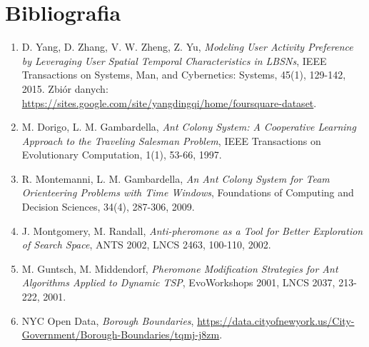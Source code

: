 \documentclass[11pt,a4paper]{article}
\begin{document}
\section*{Bibliografia}

\begin{enumerate}
  \item[{[1]}] D. Yang, D. Zhang, V. W. Zheng, Z. Yu, \emph{Modeling User Activity Preference by Leveraging User Spatial Temporal Characteristics in LBSNs}, IEEE Transactions on Systems, Man, and Cybernetics: Systems, 45(1), 129-142, 2015. Zbiór danych: \url{https://sites.google.com/site/yangdingqi/home/foursquare-dataset}.
  \item[{[2]}] M. Dorigo, L. M. Gambardella, \emph{Ant Colony System: A Cooperative Learning Approach to the Traveling Salesman Problem}, IEEE Transactions on Evolutionary Computation, 1(1), 53-66, 1997.
  \item[{[3]}] R. Montemanni, L. M. Gambardella, \emph{An Ant Colony System for Team Orienteering Problems with Time Windows}, Foundations of Computing and Decision Sciences, 34(4), 287-306, 2009.
  \item[{[4]}] J. Montgomery, M. Randall, \emph{Anti-pheromone as a Tool for Better Exploration of Search Space}, ANTS 2002, LNCS 2463, 100-110, 2002.
  \item[{[5]}] M. Guntsch, M. Middendorf, \emph{Pheromone Modification Strategies for Ant Algorithms Applied to Dynamic TSP}, EvoWorkshops 2001, LNCS 2037, 213-222, 2001.
  \item[{[6]}] NYC Open Data, \emph{Borough Boundaries}, \url{https://data.cityofnewyork.us/City-Government/Borough-Boundaries/tqmj-j8zm}.
\end{enumerate}
\end{document}
